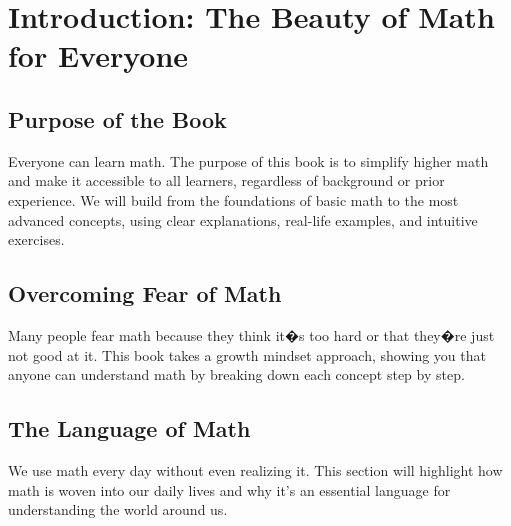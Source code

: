 \chapter{Introduction: The Beauty of Math for Everyone}
\section{Purpose of the Book}
Everyone can learn math. The purpose of this book is to simplify higher math and make it accessible to all learners, regardless of background or prior experience.
We will build from the foundations of basic math to the most advanced concepts, using clear explanations, real-life examples, and intuitive exercises.

\section{Overcoming Fear of Math}
Many people fear math because they think it�s too hard or that they�re just not good at it. This book takes a growth mindset approach, showing you that anyone can understand math by breaking down each concept step by step.

\section{The Language of Math}
We use math every day without even realizing it. This section will highlight how math is woven into our daily lives and why it's an essential language for understanding the world around us.